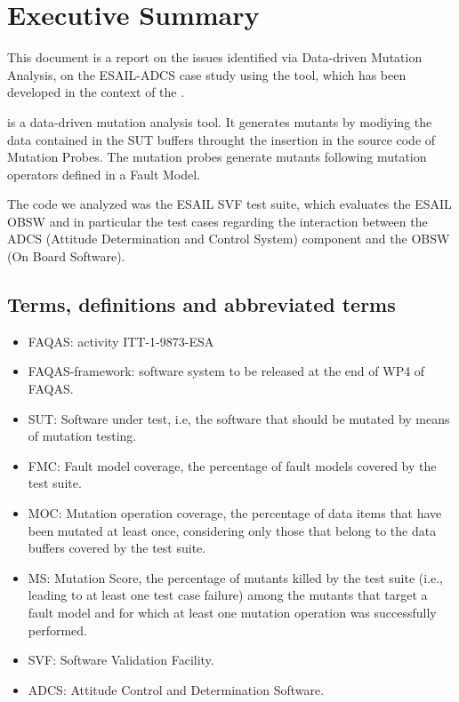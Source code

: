 
\chapter{Executive Summary}

This document is a report on the issues identified via Data-driven Mutation Analysis, on the ESAIL-ADCS case study using the \DAMA tool, which has been developed in the context of the \FAQAS.

\DAMA is a data-driven mutation analysis tool. It generates mutants by modiying the data contained in the SUT buffers throught the insertion in the source code of Mutation Probes. The mutation probes generate mutants following mutation operators defined in a Fault Model.

The code we analyzed was the ESAIL SVF test suite, which evaluates the ESAIL OBSW and in particular the test cases regarding the interaction between the ADCS (Attitude Determination and Control System) component and the OBSW (On Board Software).


\section{Terms, definitions and abbreviated terms}

\begin{itemize}
\item{FAQAS}: activity ITT-1-9873-ESA
\item{FAQAS-framework}: software system to be released at the end of WP4 of FAQAS.
\item{SUT}: Software under test, i.e, the software that should be mutated by means of mutation testing.
\item{FMC}: Fault model coverage, the percentage of fault models covered by the test suite.
\item{MOC}: Mutation operation coverage, the percentage of data items that have been mutated at least once, considering only those that belong to the data buffers covered by the test suite.
\item{MS}: Mutation Score, the percentage of mutants killed by the test suite (i.e., leading to at least one test case failure) among the mutants that target a fault model and for which at least one mutation operation was successfully performed.
\item{SVF}: Software Validation Facility.
\item{ADCS}: Attitude Control and Determination Software.

\end{itemize}

\clearpage

